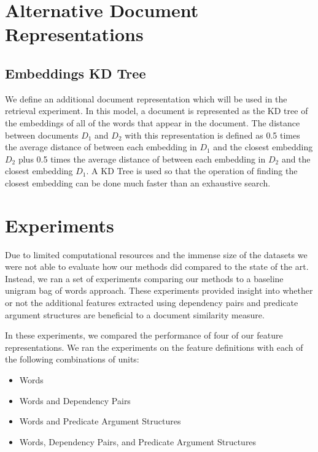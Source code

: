\documentclass[11pt]{article}
\begin{document}
\section{Alternative Document Representations}

\subsection{Embeddings KD Tree}

We define an additional document representation which will be used in the retrieval experiment. In this model, a document is represented as the KD tree of the embeddings of all of the words that appear in the document. The distance between documents $D_1$ and $D_2$ with this representation is defined as 0.5 times the average distance of between each embedding in $D_1$  and the closest embedding $D_2$ plus 0.5 times the average distance of between each embedding in $D_2$  and the closest embedding $D_1$. A KD Tree is used so that the operation of finding the closest embedding can be done much faster than an exhaustive search.


\section{Experiments}

\newcommand{\headcol}{\rowcolor{tableheadcolor}} %



Due to limited computational resources and the immense size of the datasets we were not able to evaluate how our methods did compared to the state of the art. Instead, we ran a set of experiments comparing our methods to a baseline unigram bag of words approach. These experiments provided insight into whether or not the additional features extracted using dependency pairs and predicate argument structures are beneficial to a document similarity measure. 

In these experiments, we compared the performance of four of our feature representations. We ran the experiments on the feature definitions with each of the following combinations of units:

\begin{itemize}
\item Words
\item Words and Dependency Pairs 
\item Words and Predicate Argument Structures
\item Words, Dependency Pairs, and Predicate Argument Structures
\end{itemize}
\end{document}
